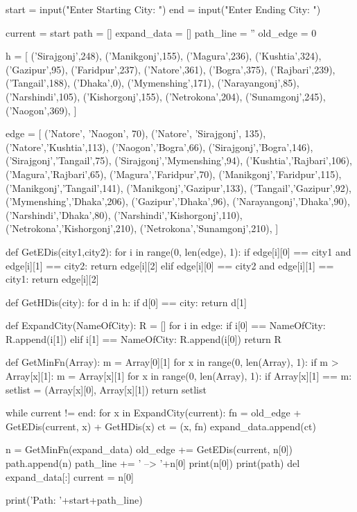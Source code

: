 start = input("Enter Starting City: ")
end = input("Enter Ending City: ")

current = start
path = []
expand_data = []
path_line = ''
old_edge = 0

h = [
        ('Sirajgonj',248),
        ('Manikgonj',155),
        ('Magura',236),
        ('Kushtia',324),
        ('Gazipur',95),
        ('Faridpur',237),
        ('Natore',361),
        ('Bogra',375),
        ('Rajbari',239),
        ('Tangail',188),
        ('Dhaka',0),
        ('Mymenshing',171),
        ('Narayangonj',85),
        ('Narshindi',105),
        ('Kishorgonj',155),
        ('Netrokona',204),
        ('Sunamgonj',245),
        ('Naogon',369),
    ]

edge = [
        ('Natore', 'Naogon', 70),
        ('Natore', 'Sirajgonj', 135),
        ('Natore','Kushtia',113),
        ('Naogon','Bogra',66),
        ('Sirajgonj','Bogra',146),
        ('Sirajgonj','Tangail',75),
        ('Sirajgonj','Mymenshing',94),
        ('Kushtia','Rajbari',106),
        ('Magura','Rajbari',65),
        ('Magura','Faridpur',70),
        ('Manikgonj','Faridpur',115),
        ('Manikgonj','Tangail',141),
        ('Manikgonj','Gazipur',133),
        ('Tangail','Gazipur',92),
        ('Mymenshing','Dhaka',206),
        ('Gazipur','Dhaka',96),
        ('Narayangonj','Dhaka',90),
        ('Narshindi','Dhaka',80),
        ('Narshindi','Kishorgonj',110),
        ('Netrokona','Kishorgonj',210),
        ('Netrokona','Sunamgonj',210),
    ]


def GetEDis(city1,city2):
    for i in range(0, len(edge), 1):
        if edge[i][0] == city1 and edge[i][1] == city2:
            return edge[i][2]
        elif edge[i][0] == city2 and edge[i][1] == city1:
            return edge[i][2]


def GetHDis(city):
    for d in h:
        if d[0] == city:
            return d[1]


def ExpandCity(NameOfCity):
    R = []
    for i in edge:
        if i[0] == NameOfCity:
            R.append(i[1])
        elif i[1] == NameOfCity:
            R.append(i[0])
    return R


def GetMinFn(Array):
    m = Array[0][1]
    for x in range(0, len(Array), 1):
        if m > Array[x][1]:
            m = Array[x][1]
    for x in range(0, len(Array), 1):
        if Array[x][1] == m:
            setlist = (Array[x][0], Array[x][1])
            return setlist

while current != end:
    for x in ExpandCity(current):
        fn = old_edge + GetEDis(current, x) + GetHDis(x)
        ct = (x, fn)
        expand_data.append(ct)

    n = GetMinFn(expand_data)
    old_edge += GetEDis(current, n[0])
    path.append(n)
    path_line += ' --> '+n[0]
    print(n[0])
    print(path)
    del expand_data[:]
    current = n[0]

print('Path: '+start+path_line)
